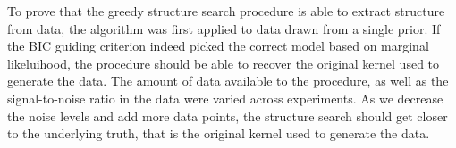 \documentclass[a4paper,12pt ]{report}
\begin{document}
To prove that the greedy structure search procedure is able to extract structure from data, the algorithm was first applied to data drawn from a single \gp{} prior. If the BIC guiding criterion indeed picked the correct 
model based on marginal likeluihood, the procedure should be able to recover the original kernel used to generate the data. The amount of data available to the procedure, as well as the signal-to-noise ratio in the data were varied across experiments. 
As we decrease the noise levels and add more data points, the structure search should get closer to the underlying truth, that is the original kernel used to generate the data.


\begin{table}[h]

\label{tbl:synthetic}
\begin{center}

\end{center}
\end{table}
\end{document}

